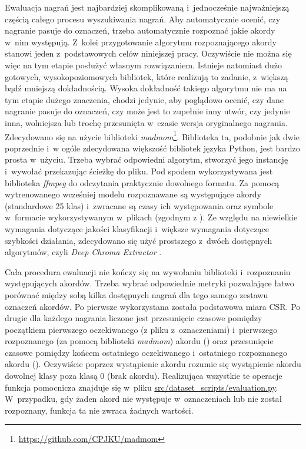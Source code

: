 Ewaluacja nagrań jest najbardziej skomplikowaną i~jednocześnie najważniejszą częścią całego procesu wyszukiwania nagrań. Aby automatycznie ocenić, czy nagranie pasuje do oznaczeń, trzeba automatycznie rozpoznać jakie akordy w~nim występują. Z~kolei przygotowanie algorytmu rozpoznającego akordy stanowi jeden z~podstawowych celów niniejszej pracy. Oczywiście nie można się więc na tym etapie posłużyć własnym rozwiązaniem. Istnieje natomiast dużo gotowych, wysokopoziomowych bibliotek, które realizują to zadanie, z~większą bądź mniejszą dokładnością. Wysoka dokładność takiego algorytmu nie ma na tym etapie dużego znaczenia, chodzi jedynie, aby poglądowo ocenić, czy dane nagranie pasuje do oznaczeń, czy może jest to zupełnie inny utwór, czy jedynie inna, wolniejsza lub trochę przesunięta w~czasie wersja oryginalnego nagrania. Zdecydowano się na użycie biblioteki \emph{madmom}\footnote{\url{https://github.com/CPJKU/madmom}}.  Biblioteka ta, podobnie jak dwie poprzednie i~w ogóle zdecydowana większość bibliotek języka Python, jest bardzo prosta w~użyciu. Trzeba wybrać odpowiedni algorytm, stworzyć jego instancję i~wywołać przekazując ścieżkę do pliku. Pod spodem wykorzystywana jest biblioteka \emph{ffmpeg} do odczytania praktycznie dowolnego formatu. Za pomocą wytrenowanego wcześniej modelu rozpoznawane są występujące akordy (standardowe 25 klas) i~zwracane są czasy ich występowania oraz symbole w~formacie wykorzystywanym w~plikach  (zgodnym z \cite{harte_towards_nodate}). Ze względu na niewielkie wymagania dotyczące jakości klasyfikacji i~większe wymagania dotyczące szybkości działania, zdecydowano się użyć prostszego z~dwóch dostępnych algorytmów, czyli \emph{Deep Chroma Extractor} \cite{korzeniowski_feature_2016}.

Cała procedura ewaluacji nie kończy się na wywołaniu biblioteki i~rozpoznaniu występujących akordów.  Trzeba wybrać odpowiednie metryki pozwalające łatwo porównać między sobą kilka dostępnych nagrań dla tego samego zestawu oznaczeń akordów. Po pierwsze wykorzystana została podstawowa miara CSR. Po drugie dla każdego nagrania liczone jest przesunięcie czasowe pomiędzy początkiem pierwszego oczekiwanego (z pliku z~oznaczeniami) i~pierwszego rozpoznanego (za pomocą biblioteki \emph{madmom}) akordu () oraz przesunięcie czasowe pomiędzy końcem ostatniego oczekiwanego i~ostatniego rozpoznanego akordu (). Oczywiście poprzez wystąpienie akordu rozumie się wystąpienie akordu dowolnej klasy poza klasą 0 (brak akordu). Realizująca wszystkie te operacje funkcja pomocnicza znajduje się w~pliku \url{src/dataset_scripts/evaluation.py}. W~przypadku, gdy żaden akord nie występuje w~oznaczeniach lub nie został rozpoznany, funkcja ta nie zwraca żadnych wartości.

